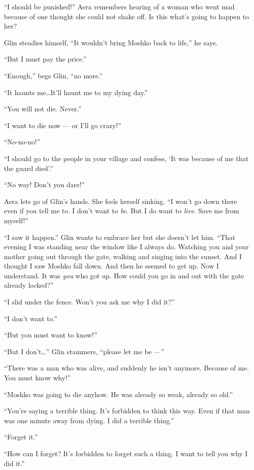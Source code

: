 \documentclass[twoside,11pt,openany]{book}
\begin{document}
``I should be punished!'' Aera remembers hearing of a woman who went mad because of one
thought she could not shake off. Is this what's going to happen to her?

Glin steadies himself, ``It wouldn't bring Moshko back to life,'' he says.

``But I must pay the price.''

``Enough,'' begs Glin, ``no more.''

``It haunts me{\ldots}It'll haunt me to my dying day.''

``You will not die. Never.''

``I want to die now --- or I'll go crazy!''

``No-no-no!''

``I should go to the people in your village and confess, `It was because of me that the guard
died'.''

``No way! Don't you dare!''

Aera lets go of Glin's hands. She feels herself sinking. ``I won't go down there even if you tell me to. I
don't want to \textit{be}. But I do want to \textit{live}. Save me from myself!''

``I saw it happen.'' Glin wants to embrace her but she doesn't let him. ``That
evening I was standing near the window like I always do. Watching you and your mother going out through the gate,
walking and singing into the sunset. And I thought I saw Moshko fall down. And then he seemed to get up. Now I
understand. It was \textit{you} who got up. How could you go in and out with the gate already locked?''

``I slid under the fence. Won't you ask me why I did it?''

``I don't want to.''

``But you must want to know!''

``But I don't{\ldots}'' Glin stammers, ``please let me be ---''

``There was a man who was alive, and suddenly he isn't anymore. Because of me. You must know
why!''

``Moshko was going to die anyhow. He was already so weak, already so old.''

``You're saying a terrible thing. It's forbidden to think this way. Even if that man was one minute away
from dying. I did a terrible thing.''

``Forget it.''

``How can I forget? It's forbidden to forget such a thing. I want to tell you why I did it.''
\end{document}
